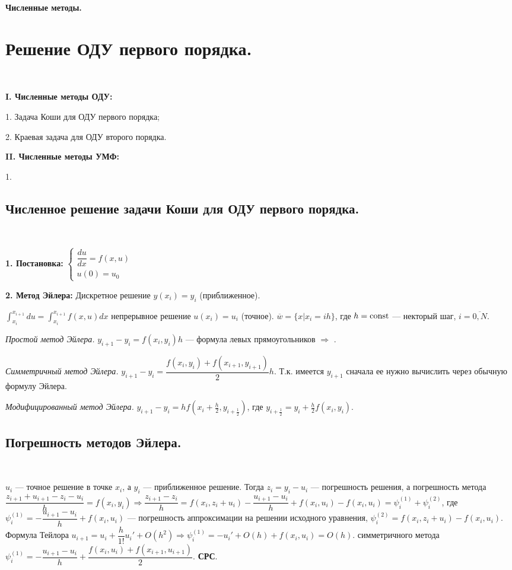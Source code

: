 \documentclass[9pt]{article}
\begin{document}
\begin{center}
    \huge\textbf{Численные методы.}
\end{center}

\section{Решение ОДУ первого порядка.}

\ 
\par\textbf{I. Численные методы ОДУ:}
\par1. Задача Коши для ОДУ первого порядка;
\par2. Краевая задача для ОДУ второго порядка.
\par\textbf{II. Численные методы УМФ:}
\par1. 

\subsection{Численное решение задачи Коши для ОДУ первого порядка.}

\ 
\par\textbf{1. Постановка:} \(\left\{\begin{array}{l}
    \dfrac{du}{dx}=f(x,u) \\
    u(0) = u_0
\end{array}\right.\)
\par\textbf{2. Метод Эйлера:} Дискретное решение \(y(x_i)=y_i\) (приближенное).
\par\(\int_{x_i}^{x_{i+1}} du=\int_{x_i}^{x_{i+1}} f(x,u)dx\) непрерывное решение \(u(x_i)=u_i\) (точное).
\parСетка \(\overline w=\{x|x_i=ih\}\), где \(h=\operatorname{const}\) --- некторый шаг, \(i=\overline{0,N}\).
\par\textit{Простой метод Эйлера.} \(y_{i+1}-y_i=f(x_i,y_i)h\) --- формула левых прямоугольников \(\Rightarrow\) .
\par\textit{Симметричный метод Эйлера.} \(y_{i+1}-y_i=\dfrac{f(x_i,y_i)+f(x_{i+1},y_{i+1})}{2}h\). Т.к. имеется \(y_{i+1}\) сначала ее нужно вычислить через обычную формулу Эйлера.
\par\textit{Модифицированный метод Эйлера.} \(y_{i+1}-y_i=hf(x_i+\frac{h}{2},y_{i+\frac{1}{2}})\), где \(y_{i+\frac{1}{2}}=y_i+\frac{h}{2}f(x_i,y_i)\).

\subsection{Погрешность методов Эйлера.}

\ 
\par\(u_i\) --- точное решение в точке \(x_i\), а \(y_i\) --- приближенное решение. Тогда \(z_i=y_i-u_i\) --- погрешность решения, а погрешность метода \(\dfrac{z_{i+1}+u_{i+1}-z_i-u_i}{h}=f(x_i,y_i)\Rightarrow \dfrac{z_{i+1}-z_i}{h}=f(x_i,z_i+u_i)-\dfrac{u_{i+1}-u_i}{h}+f(x_i,u_i)-f(x_i,u_i)=\psi^{(1)}_i+\psi^{(2)}_i\), где \(\psi^{(1)}_i=-\dfrac{u_{i+1}-u_i}{h}+f(x_i,u_i)\) --- погрешность аппроксимации на решении исходного уравнения, \(\psi^{(2)}_i=f(x_i,z_i+u_i)-f(x_i,u_i)\). Формула Тейлора \(u_{i+1}=u_i+\dfrac{h}{1!}u_i'+O(h^2)\Rightarrow \psi^{(1)}_i=-u_i'+O(h)+f(x_i,u_i)=O(h)\).
 симметричного метода \(\psi^{(1)}_i=-\dfrac{u_{i+1}-u_i}{h}+\dfrac{f(x_i,u_i)+f(x_{i+1},u_{i+1})}{2}\). \textbf{СРС}.
\end{document}
